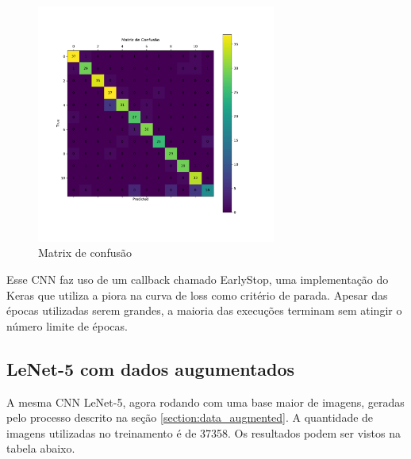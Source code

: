 \documentclass[12pt,
	english,			%
	french,				%
	spanish,			%
	brazil,				%
	]{article}
\begin{document}
\begin{figure}[!htb]
\centering
\includegraphics[width=0.7\textwidth]{images/cm_simple_cnn.pdf}
\caption{\label{fig:grafico01}Matrix de confusão}
\end{figure}

Esse CNN faz uso de um callback chamado EarlyStop, uma implementação do Keras que utiliza a piora na curva de loss como critério de parada. Apesar das épocas utilizadas serem grandes, a maioria das execuções terminam sem atingir o número limite de épocas.

\clearpage

\subsection{LeNet-5 com dados augumentados}

A mesma CNN LeNet-5, agora rodando com uma base maior de imagens, geradas pelo processo descrito na seção \ref{section:data_augmented}. A quantidade de imagens utilizadas no treinamento é de 37358. Os resultados podem ser vistos na tabela abaixo.
\end{document}
